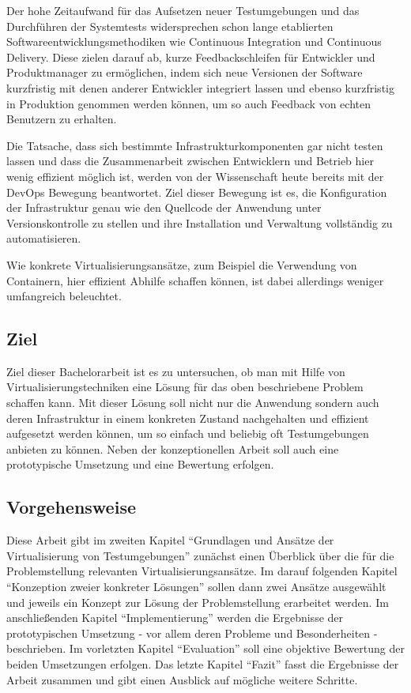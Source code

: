 Der hohe Zeitaufwand für das Aufsetzen neuer Testumgebungen und das Durchführen der Systemtests widersprechen schon lange etablierten Softwareentwicklungsmethodiken wie Continuous Integration und Continuous Delivery. Diese zielen darauf ab, kurze Feedbackschleifen für Entwickler und Produktmanager zu ermöglichen, indem sich neue Versionen der Software kurzfristig mit denen anderer Entwickler integriert lassen und ebenso kurzfristig in Produktion genommen werden können, um so auch Feedback von echten Benutzern zu erhalten.

Die Tatsache, dass sich bestimmte Infrastrukturkomponenten gar nicht testen lassen und dass die Zusammenarbeit zwischen Entwicklern und Betrieb hier wenig effizient möglich ist, werden von der Wissenschaft heute bereits mit der DevOps Bewegung beantwortet. Ziel dieser Bewegung ist es, die Konfiguration der Infrastruktur genau wie den Quellcode der Anwendung unter Versionskontrolle zu stellen und ihre Installation und Verwaltung vollständig zu automatisieren.

Wie konkrete Virtualisierungsansätze, zum Beispiel die Verwendung von Containern, hier effizient Abhilfe schaffen können, ist dabei allerdings weniger umfangreich beleuchtet.

\subsection{Ziel}

Ziel dieser Bachelorarbeit ist es zu untersuchen, ob man mit Hilfe von Virtualisierungstechniken eine Lösung für das oben beschriebene Problem schaffen kann. Mit dieser Lösung soll nicht nur die Anwendung sondern auch deren Infrastruktur in einem konkreten Zustand nachgehalten und effizient aufgesetzt werden können, um so einfach und beliebig oft Testumgebungen anbieten zu können. Neben der konzeptionellen Arbeit soll auch eine prototypische Umsetzung und eine Bewertung erfolgen.

\subsection{Vorgehensweise}

Diese Arbeit gibt im zweiten Kapitel "`Grundlagen und Ansätze der Virtualisierung von Testumgebungen"' zunächst einen Überblick über die für die Problemstellung relevanten Virtualisierungsansätze. Im darauf folgenden Kapitel "`Konzeption zweier konkreter Lösungen"' sollen dann zwei Ansätze ausgewählt und jeweils ein Konzept zur Lösung der Problemstellung erarbeitet werden. Im anschließenden Kapitel "`Implementierung"' werden die Ergebnisse der prototypischen Umsetzung - vor allem deren Probleme und Besonderheiten - beschrieben. Im vorletzten Kapitel "`Evaluation"' soll eine objektive Bewertung der beiden Umsetzungen erfolgen. Das letzte Kapitel "`Fazit"' fasst die Ergebnisse der Arbeit zusammen und gibt einen Ausblick auf mögliche weitere Schritte.
